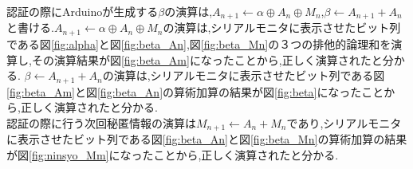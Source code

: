認証の際にArduinoが生成する$\beta$の演算は,$A_{n+1} \leftarrow \alpha \oplus A_n \oplus M_n$,$\beta \leftarrow A_{n+1} + A_n$と書ける.$A_{n+1} \leftarrow \alpha \oplus A_n \oplus M_n$の演算は,シリアルモニタに表示させたビット列である図\ref{fig:alpha}と図\ref{fig:beta_An},図\ref{fig:beta_Mn}の３つの排他的論理和を演算し,その演算結果が図\ref{fig:beta_Am}になったことから,正しく演算されたと分かる.
$\beta \leftarrow A_{n+1} + A_n$の演算は,シリアルモニタに表示させたビット列である図\ref{fig:beta_Am}と図\ref{fig:beta_An}の算術加算の結果が図\ref{fig:beta}になったことから,正しく演算されたと分かる.\\
認証の際に行う次回秘匿情報の演算は$M_{n+1} \leftarrow A_n + M_n$であり,シリアルモニタに表示させたビット列である図\ref{fig:beta_An}と図\ref{fig:beta_Mn}の算術加算の結果が図\ref{fig:ninsyo_Mm}になったことから,正しく演算されたと分かる.\\

